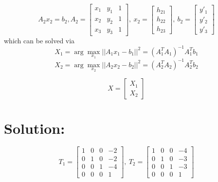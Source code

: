 \documentclass[12pt]{article}
\begin{document}
\begin{equation*}
A_2x_2 = b_2, A_2 = \left[ \begin{array}{cccccc}
x_1 & y_1 & 1\\
x_2 & y_2 & 1\\
x_3 & y_3 & 1
\end{array} \right],\  x_2 = \left[ \begin{array}{c}
h_{21} \\
h_{22} \\
h_{23} 
\end{array} \right],\  b_2 = \left[ \begin{array}{c}
y'_1\\
y'_2\\
y'_3
\end{array} \right] 
\end{equation*}
which can be solved via
\begin{equation*}
    X_1 = \arg\max_{x_1}||A_1x_1-b_1||^2 = (A_1^TA_1)^{-1}A_1^Tb_1
\end{equation*}
\begin{equation*}
    X_2 = \arg\max_{x_2}||A_2x_2-b_2||^2 = (A_2^TA_2)^{-1}A_2^Tb_2
\end{equation*}

\begin{equation*}
X = \left[ \begin{array}{c}
X_1\\
X_2
\end{array} \right]
\end{equation*}
\section{Solution:}
\begin{equation*}
T_1 = \left[ \begin{array}{cccc}
1 & 0 & 0 & -2\\
0 & 1 & 0 & -2\\
0 & 0 & 1 & -4\\
0 & 0 & 0 & 1
\end{array} \right],\ T_2 = \left[ \begin{array}{cccc}
1 & 0 & 0 & -4\\
0 & 1 & 0 & -3\\
0 & 0 & 1 & -3\\
0 & 0 & 0 & 1
\end{array} \right]
\end{equation*}
\end{document}
